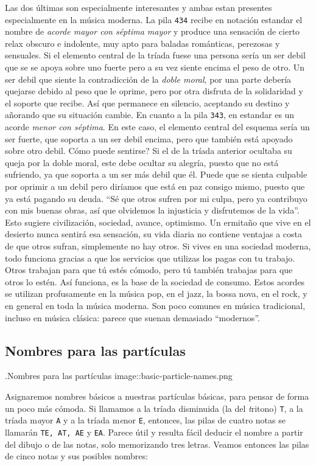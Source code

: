 \documentclass[]{article}
\begin{document}
Las dos últimas son especialmente interesantes y ambas estan presentes especialmente en la música moderna. La pila \texttt{434} recibe en notación estandar el nombre de \emph{acorde mayor con séptima mayor} y produce una sensación de cierto relax obscuro e indolente, muy apto para baladas románticas, perezosas y sensuales. Si el elemento central de la tríada fuese una persona sería un ser debil que se se apoya sobre uno fuerte pero a su vez siente encima el peso de otro. Un ser debil que siente la contradicción de la \emph{doble moral}, por una parte debería quejarse debido al peso que le oprime, pero por otra disfruta de la solidaridad y el soporte que recibe. Así que permanece en silencio, aceptando su destino y añorando que su situación cambie. En cuanto a la pila \texttt{343}, en estandar es un acorde \emph{menor con séptima}. En este caso, el elemento central del esquema sería un ser fuerte, que soporta a un ser debil encima, pero que también está apoyado sobre otro debil. Cómo puede sentirse? Si el de la tríada anterior ocultaba su queja por la doble moral, este debe ocultar su alegría, puesto que no está sufriendo, ya que soporta a un ser más debil que él. Puede que se sienta culpable por oprimir a un debil pero diríamos que está en paz consigo mismo, puesto que ya está pagando su deuda. ``Sé que otros sufren por mi culpa, pero ya contribuyo con mis buenas obras, así que olvidemos la injusticia y disfrutemos de la vida''. Esto sugiere civilización, sociedad, avance, optimismo. Un ermitaño que vive en el desierto nunca sentirá esa sensación, su vida diaria no contiene ventajas a costa de que otros sufran, simplemente no hay otros. Si vives en una sociedad moderna, todo funciona gracias a que los servicios que utilizas los pagas con tu trabajo. Otros trabajan para que tú estés cómodo, pero tú también trabajas para que otros lo estén. Así funciona, es la base de la sociedad de consumo. Estos acordes se utilizan profusamente en la música pop, en el jazz, la bossa nova, en el rock, y en general en toda la música moderna. Son poco comunes en música tradicional, incluso en música clásica: parece que suenan demasiado ``modernos''.

\subsection{Nombres para las partículas}

.Nombres para las partículas image::basic-particle-names.png

Asignaremos nombres básicos a nuestras partículas básicas, para pensar de forma un poco más cómoda. Si llamamos a la tríada disminuida (la del \emph{t}ritono) \texttt{T}, a la tríada m\emph{a}yor \texttt{A} y a la tríada m\emph{e}nor \texttt{E}, entonces, las pilas de cuatro notas se llamarán \texttt{TE,\ AT,\ AE} y \texttt{EA}. Parece útil y resulta fácil deducir el nombre a partir del dibujo o de las notas, solo memorizando tres letras. Veamos entonces las pilas de cinco notas y sus posibles nombres:
\end{document}
